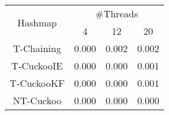 \begin{tabular}{|c|c|c|c|}
\hline
\multirow{2}{*}{Hashmap} & \multicolumn{3}{c|}{\#Threads}\\\cline{2-4}& 4 & 12 & 20\\
\hline
\hline
T-Chaining & 0.000 & 0.002 & 0.002\\
T-CuckooIE & 0.000 & 0.000 & 0.001\\
T-CuckooKF & 0.000 & 0.000 & 0.001\\
NT-Cuckoo & 0.000 & 0.000 & 0.000\\
\hline
\end{tabular}
